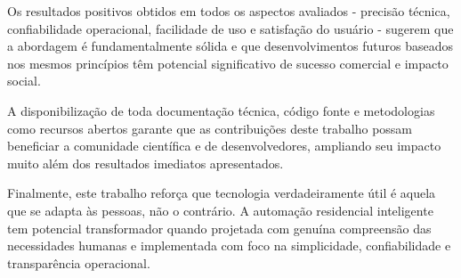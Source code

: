 \documentclass[twoside,english,brazilian]{UNISINOSmonografia}
\begin{document}
Os resultados positivos obtidos em todos os aspectos avaliados - precisão técnica, confiabilidade operacional, facilidade de uso e satisfação do usuário - sugerem que a abordagem é fundamentalmente sólida e que desenvolvimentos futuros baseados nos mesmos princípios têm potencial significativo de sucesso comercial e impacto social.

A disponibilização de toda documentação técnica, código fonte e metodologias como recursos abertos garante que as contribuições deste trabalho possam beneficiar a comunidade científica e de desenvolvedores, ampliando seu impacto muito além dos resultados imediatos apresentados.

Finalmente, este trabalho reforça que tecnologia verdadeiramente útil é aquela que se adapta às pessoas, não o contrário. A automação residencial inteligente tem potencial transformador quando projetada com genuína compreensão das necessidades humanas e implementada com foco na simplicidade, confiabilidade e transparência operacional.




\end{document}
